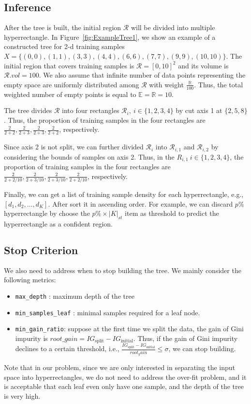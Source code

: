 \documentclass[11pt,onecolumn]{IEEEtran}
\begin{document}
\subsection{Inference}
After the tree is built, the initial region $\mathcal R$ will be divided into multiple hyperrectangle. In Figure~\ref{fig:ExampleTree1}, we show an example of a constructed tree for 2-d training samples  $X=\{(0,0),(1,1),(3,3),(4,4),(6,6),(7,7),(9,9),(10,10)\}$.  The initial region that covers training samples is $\mathcal R=[0,10]^2$ and its volume is $\mathcal R.vol=100$. We also assume  that infinite number of data points representing the empty space are uniformly distributed among $\mathcal R$ with weight $\frac{\mathbb R}{100}$. Thus, the total weighted number of empty points is equal to $\mathbb E=\mathbb R=10$.  


The tree divides $\mathcal R$ into four rectangles $\mathcal R_i,~i\in\{1,2,3,4\}$ by cut axis 1 at $\{2,5,8\}$.  Thus, the proportion of training samples in the four rectangles are $\frac{2}{2+2},\frac{2}{2+3},\frac{2}{2+3},\frac{2}{2+2}$, respectively.

Since axis 2 is not split, we can further divided $\mathcal R_i$ into  $\mathcal R_{i,1}$ and $\mathcal R_{i,2}$ by considering the bounds of samples on axis 2.  Thus, in the $R_{i,1}~i\in\{1,2,3,4\}$, the proportion of training samples in the four rectangles are $\frac{2}{2+2/10},\frac{2}{2+3/10},\frac{2}{2+3/10},\frac{2}{2+2/10}$, respectively.
  
Finally, we can get a list of training sample density for each hyperrectangle, e.g., $[d_1,d_2,\ldots,d_K]$. After sort it in ascending order. For example, we can discard $p\%$ hyperrectangle  by choose the $p\%\times |K|_{st}$ item as threshold to predict the hyperrectangle as a confident region.




\subsection{Stop Criterion}
We also need to address when to stop building the tree. We mainly consider the following metrics:
\begin{itemize}
        \item \texttt{max\_depth} : maximum depth of the tree
        \item \texttt{min\_samples\_leaf}  : minimal samples required for a leaf node.
        \item \texttt{min\_gain\_ratio}: suppose at the first time we split the data, the gain of Gini impurity is $root\_gain=IG_{\mbox{split}} -IG_{\mbox{initial}}$. Thus, if the gain of Gini impurity  declines to a certain threshold, i.e., $\frac{IG_{\mbox{split}} -IG_{\mbox{initial}}}{root_gain}\leq \sigma$, we can stop building.
\end{itemize}
Note that in our problem, since we are only interested in separating the input space into hyperrectangles, we do not need to address the over-fit problem, and it is acceptable that each leaf even only have one sample, and the depth of the tree is very high.
\end{document}

